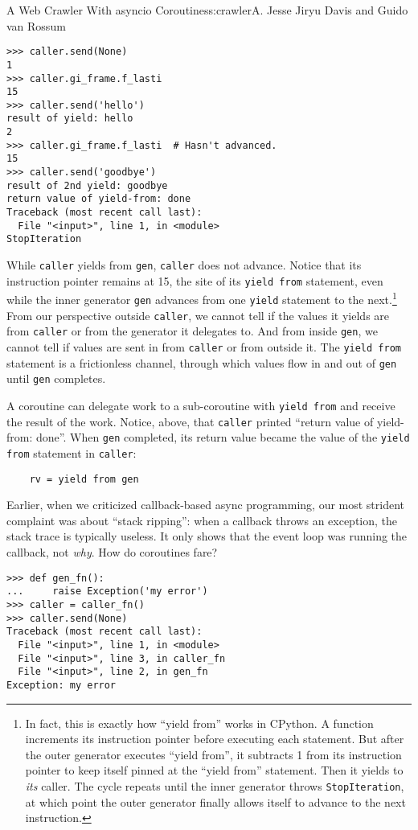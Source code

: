 \begin{aosachapter}{A Web Crawler With asyncio Coroutines}{s:crawler}{A. Jesse Jiryu Davis and Guido van Rossum}
\begin{verbatim}
>>> caller.send(None)
1
>>> caller.gi_frame.f_lasti
15
>>> caller.send('hello')
result of yield: hello
2
>>> caller.gi_frame.f_lasti  # Hasn't advanced.
15
>>> caller.send('goodbye')
result of 2nd yield: goodbye
return value of yield-from: done
Traceback (most recent call last):
  File "<input>", line 1, in <module>
StopIteration
\end{verbatim}

While \texttt{caller} yields from \texttt{gen}, \texttt{caller} does not
advance. Notice that its instruction pointer remains at 15, the site of
its \texttt{yield from} statement, even while the inner generator
\texttt{gen} advances from one \texttt{yield} statement to the
next.\footnote{In fact, this is exactly how ``yield from'' works in
  CPython. A function increments its instruction pointer before
  executing each statement. But after the outer generator executes
  ``yield from'', it subtracts 1 from its instruction pointer to keep
  itself pinned at the ``yield from'' statement. Then it yields to
  \emph{its} caller. The cycle repeats until the inner generator throws
  \texttt{StopIteration}, at which point the outer generator finally
  allows itself to advance to the next instruction.} From our
perspective outside \texttt{caller}, we cannot tell if the values it
yields are from \texttt{caller} or from the generator it delegates to.
And from inside \texttt{gen}, we cannot tell if values are sent in from
\texttt{caller} or from outside it. The \texttt{yield from} statement is
a frictionless channel, through which values flow in and out of
\texttt{gen} until \texttt{gen} completes.

A coroutine can delegate work to a sub-coroutine with
\texttt{yield from} and receive the result of the work. Notice, above,
that \texttt{caller} printed ``return value of yield-from: done''. When
\texttt{gen} completed, its return value became the value of the
\texttt{yield from} statement in \texttt{caller}:

\begin{verbatim}
    rv = yield from gen
\end{verbatim}

Earlier, when we criticized callback-based async programming, our most
strident complaint was about ``stack ripping'': when a callback throws
an exception, the stack trace is typically useless. It only shows that
the event loop was running the callback, not \emph{why}. How do
coroutines fare?

\begin{verbatim}
>>> def gen_fn():
...     raise Exception('my error')
>>> caller = caller_fn()
>>> caller.send(None)
Traceback (most recent call last):
  File "<input>", line 1, in <module>
  File "<input>", line 3, in caller_fn
  File "<input>", line 2, in gen_fn
Exception: my error
\end{verbatim}


\end{aosachapter}

